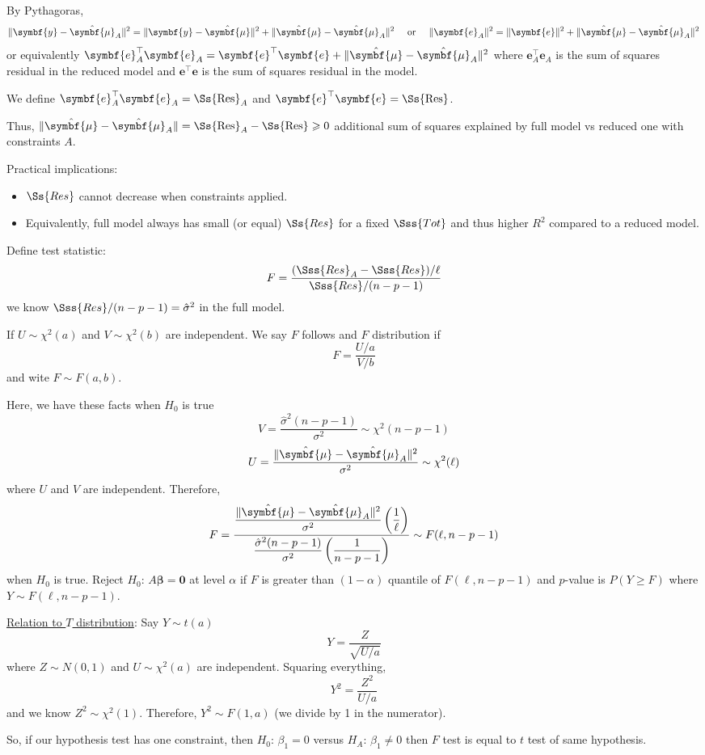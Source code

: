 By Pythagoras,
\[ \norm{\symbf{y}-\hat{\symbf{\mu}}_A}^2=
    \norm{\symbf{y}-\hat{\symbf{\mu}}}^2+
    \norm{\hat{\symbf{\mu}}-\hat{\symbf{\mu}}_A}^2
    \quad\text{ or }\quad
    \norm{\symbf{e}_A}^2=\norm{\symbf{e}}^2+\norm{\hat{\symbf{\mu}}-
        \hat{\symbf{\mu}}_A
    }^2 \]
or equivalently $ \symbf{e}_A^\top \symbf{e}_A=\symbf{e}^\top \symbf{e}
    +\norm{\hat{\symbf{\mu}}-
        \hat{\symbf{\mu}}_A
    }^2 $
where $ \symbf{e}_A^\top \symbf{e}_A $ is the sum of squares
residual in the reduced model and $ \symbf{e}^\top \symbf{e} $
is the sum of squares residual in the model.

We define $ \symbf{e}_A^\top \symbf{e}_A=\Ss{\text{Res}}_A $
and $ \symbf{e}^\top \symbf{e} =\Ss{\text{Res}} $.

Thus, $ \norm{\hat{\symbf{\mu}}-\hat{\symbf{\mu}}_A}=
    \Ss{\text{Res}}_A-\Ss{\text{Res}} \geqslant 0 $
additional sum of squares explained by full model vs reduced
one with constraints $ A $.

Practical implications:
\begin{itemize}
    \item $ \Ss{Res} $ cannot decrease when constraints applied.
    \item Equivalently, full model always has small (or equal)
          $ \Ss{Res} $ for a fixed $ \Sss{Tot} $
          and thus higher $ R^2 $ compared to a reduced model.
\end{itemize}

Define test statistic:
\[ F=\frac{(\Sss{Res}_A-\Sss{Res})/\ell}{\Sss{Res}/(n-p-1)}  \]
we know $ \Sss{Res}/(n-p-1)=\hat{\sigma}^2 $ in the full model.
\begin{Definition}{}{}
    If $ U \sim \chi^2(a) $ and $ V \sim \chi^2(b) $
    are independent. We say $ F $ follows and
    $ F $ distribution if
    \[ F=\frac{U/a}{V/b} \]
    and wite $ F \sim F(a,b) $.
\end{Definition}
Here, we have these facts when $ H_0 $ is true
\[ V=\frac{\hat{\sigma}^2(n-p-1)}{\sigma^2}\sim \chi^2(n-p-1)  \]
\[ U=\frac{\norm{\hat{\symbf{\mu}}-\hat{\symbf{\mu}}_A}^2}{\sigma^2}\sim \chi^2(\ell)  \]
where $ U $ and $ V $ are independent. Therefore,
\[ F=\dfrac{\dfrac{\norm{\hat{\symbf{\mu}}-\hat{\symbf{\mu}}_A}^2}{\sigma^2}
        \left( \dfrac{1}{\ell} \right)}{\dfrac{\hat{\sigma}^2(n-p-1)}{\sigma^2}
        \left( \dfrac{1}{n-p-1} \right)} \sim F(\ell,n-p-1)   \]
when $ H_0 $ is true. Reject
$ H_0 $: $ A\symbf{\beta}=\symbf{0} $ at level $ \alpha $
if $ F $ is greater than $ (1-\alpha) $
quantile of $ F(\ell,n-p-1) $
and $ p $-value is $ P(Y\geqslant F) $ where $ Y \sim F(\ell,n-p-1) $.

\underline{Relation to $ T $ distribution}:
Say $ Y \sim t(a) $
\[ Y=\frac{Z}{\sqrt{U/a}}  \]
where $ Z \sim N(0,1) $ and $ U \sim \chi^2(a) $ are independent.
Squaring everything,
\[ Y^2=\frac{Z^2}{U/a} \]
and we know $ Z^2 \sim \chi^2(1) $. Therefore,
$ Y^2 \sim F(1,a) $ (we divide by 1 in the numerator).

So, if our hypothesis test has one constraint,
then $ H_0 $: $ \beta_1=0 $ versus $ H_A $: $ \beta_1\neq 0 $
then $ F $ test is equal to $ t $ test of same hypothesis.
